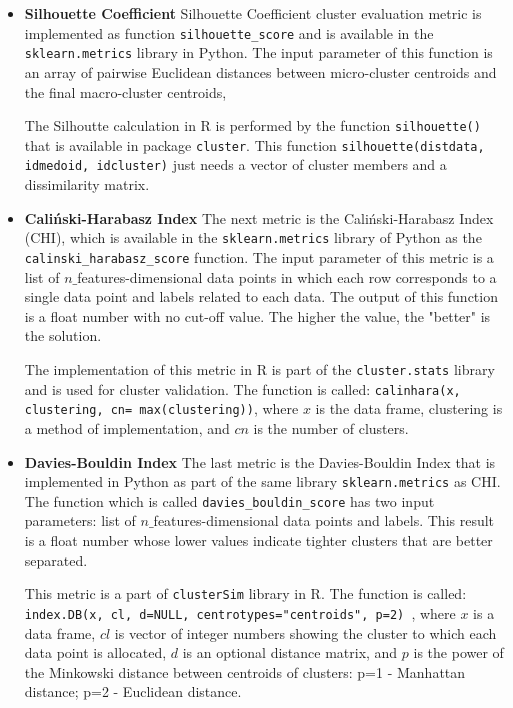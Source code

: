 \begin{itemize}
    

\item\textbf{Silhouette Coefficient}
Silhouette Coefficient cluster evaluation metric is implemented as function \texttt{silhouette\_score} and is available in the \texttt{sklearn.metrics} library in Python.  The input parameter of this function is an array of pairwise Euclidean distances between micro-cluster centroids and the final macro-cluster centroids, %

The Silhoutte calculation in R is performed by the function \texttt{silhouette()} that is available in package \texttt{cluster}. This function \texttt{silhouette(distdata, idmedoid, idcluster)} just needs a vector of cluster members and a dissimilarity matrix.




\item\textbf{Caliński-Harabasz Index}
The next metric is the Caliński-Harabasz Index (CHI), which is available in the \texttt{sklearn.metrics} library of Python as the \texttt{calinski\_harabasz\_score} function. The input parameter of this metric is a list of $n\_$features-dimensional data points in which each row corresponds to a single data point and labels related to each data. The output of this function is a float number with no cut-off value. The higher the value, the "better" is the solution.

The implementation of this metric in R is part of the \texttt{cluster.stats} library and is used for cluster validation. The function is called: \texttt{calinhara(x, clustering, cn= max(clustering))}, where $x$ is the data frame, clustering is a method of implementation, and $cn$ is the number of clusters.



\item\textbf{Davies-Bouldin Index}
The last metric is the Davies-Bouldin Index that is implemented in Python as part of the same library \texttt{sklearn.metrics} as CHI. The function which is called \texttt{davies\_bouldin\_score} has two input parameters: list of $n\_$features-dimensional data points and labels. This result is a float number whose lower values indicate tighter clusters that are better separated.


This metric is a part of \texttt{clusterSim} library in R. The function is called: \texttt{index.DB(x, cl, d=NULL, centrotypes="centroids", p=2) }, where $x$ is a data frame, $cl$ is vector of integer numbers showing the cluster to which each data point is allocated, $d$ is an optional distance matrix, and $p$ is the power of the Minkowski distance between centroids of clusters: p=1 - Manhattan distance; p=2 - Euclidean distance.


\end{itemize}


